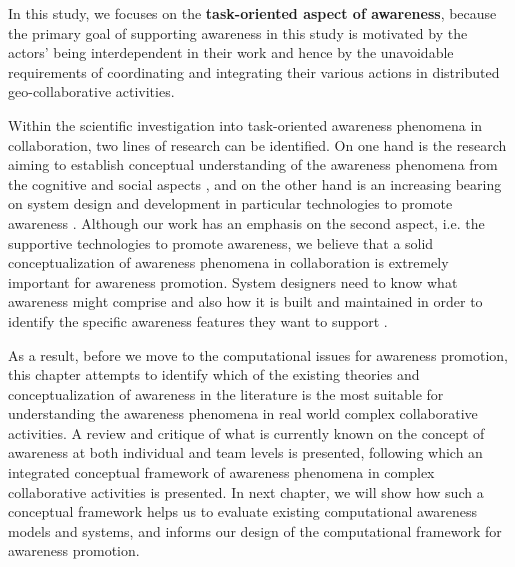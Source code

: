 In this study, we focuses on the \textbf{task-oriented aspect of awareness}, because the primary goal of supporting awareness in this study is motivated by the actors' being interdependent in their work and hence by the unavoidable requirements of coordinating and integrating their various actions in distributed geo-collaborative activities.

Within the scientific investigation into task-oriented awareness phenomena in collaboration, two lines of research can be identified. On one hand is the research aiming to establish conceptual understanding of the awareness phenomena from the cognitive and social aspects \cite{Salmon2008}, and on the other hand is an increasing bearing on system design and development in particular technologies to promote awareness \cite{rittenbruch2009a}. Although our work has an emphasis on the second aspect, i.e. the supportive technologies to promote awareness, we believe that a solid conceptualization of awareness phenomena in collaboration is extremely important for awareness promotion. System designers need to know what awareness might comprise and also how it is built and maintained in order to identify the specific awareness features they want to support \cite{Stanton2006}. 

As a result, before we move to the computational issues for awareness promotion, this chapter attempts to identify which of the existing theories and conceptualization of awareness in the literature is the most suitable for understanding the awareness phenomena in real world complex collaborative activities. A review and critique of what is currently known on the concept of awareness at both individual and team levels is presented, following which an integrated conceptual framework of awareness phenomena in complex collaborative activities is presented. In next chapter, we will show how such a conceptual framework helps us to evaluate existing computational awareness models and systems, and informs our design of the computational framework for awareness promotion.


